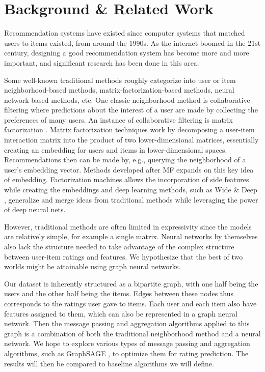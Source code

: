 \documentclass{article}
\begin{document}
\section{Background \& Related Work}

Recommendation systems have existed since computer systems that matched users to items existed, from around the 1990s. As the internet boomed in the 21st century, designing a good recommendation system has become more and more important, and significant research has been done in this area. 

Some well-known traditional methods roughly categorize into user or item neighborhood-based methods, matrix-factorization-based methods, neural network-based methods, etc. One classic neighborhood method is collaborative filtering \cite{cf} where predictions about the interest of a user are made by collecting the preferences of many users. An instance of collaborative filtering is matrix factorization 
\cite{mf}. Matrix factorization techniques work by decomposing a user-item interaction matrix into the product of two lower-dimensional matrices, essentially creating an embedding for users and items in lower-dimensional spaces. Recommendations then can be made by, e.g., querying the neighborhood of a user's embedding vector. Methods developed after MF expands on this key idea of embedding. Factorization machines \cite{fm} allows the incorporation of side features while creating the embeddings and deep learning methods, such as Wide \& Deep \cite{wideanddeep}, generalize and merge ideas from traditional methods while leveraging the power of deep neural nets.

However, traditional methods are often limited in expressivity since the models are relatively simple, for example a single matrix. Neural networks by themselves also lack the structure needed to take advantage of the complex structure between user-item ratings and features. We hypothesize that the best of two worlds might be attainable using graph neural networks.

Our dataset is inherently structured as a bipartite graph, with one half being the users and the other half being the items. Edges between these nodes thus corresponds to the ratings user gave to items. Each user and each item also have features assigned to them, which can also be represented in a graph neural network. Then the message passing and aggregation algorithms applied to this graph is a combination of both the traditional neighborhood method and a neural network. We hope to explore various types of message passing and aggregation algorithms, such as GraphSAGE \cite{graphsage}, to optimize them for rating prediction. The results will then be compared to baseline algorithms we will define.
\end{document}
